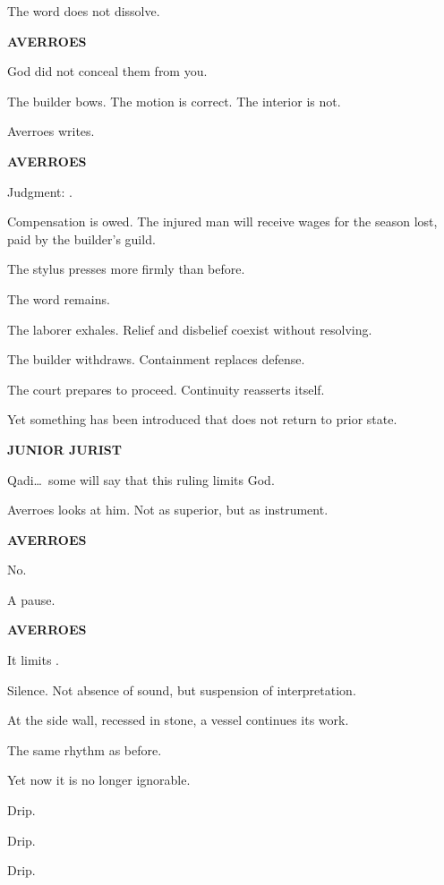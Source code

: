 \medskip

The word does not dissolve.

\medskip

\textbf{AVERROES}

God did not conceal them from you.

\medskip

The builder bows. The motion is correct. The interior is not.

\medskip

Averroes writes.

\medskip

\textbf{AVERROES}

Judgment: .

Compensation is owed. The injured man will receive wages for the season lost,
paid by the builder's guild.

\medskip

The stylus presses more firmly than before.

The word remains.

\medskip

The laborer exhales. Relief and disbelief coexist without resolving.

The builder withdraws. Containment replaces defense.

\medskip

The court prepares to proceed. Continuity reasserts itself.

Yet something has been introduced that does not return to prior state.

\medskip

\textbf{JUNIOR JURIST}

Qadi\ldots\ some will say that this ruling limits God.

\medskip

Averroes looks at him. Not as superior, but as instrument.

\medskip

\textbf{AVERROES}

No.

\medskip

A pause.

\medskip

\textbf{AVERROES}

It limits .

\medskip

Silence. Not absence of sound, but suspension of interpretation.

\medskip

At the side wall, recessed in stone, a vessel continues its work.

The same rhythm as before.

Yet now it is no longer ignorable.

\medskip

Drip.

\medskip

Drip.

\medskip

Drip.
